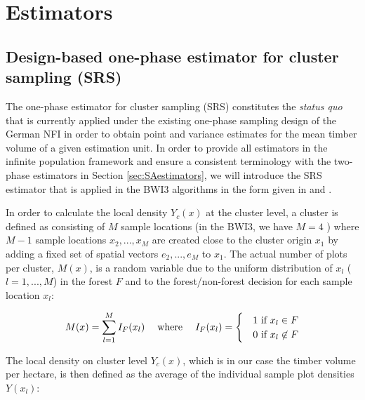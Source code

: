 \documentclass[remotesensing,article,submit,moreauthors,pdftex,10pt,a4paper]{mdpi}
\begin{document}
\section{Estimators}
\label{sec:estimators}


\subsection{Design-based one-phase estimator for cluster sampling (SRS)}
\label{sec:srs_estimator}

The one-phase estimator for cluster sampling (SRS) constitutes the \textit{status quo} that is currently applied under the existing one-phase sampling design of the German NFI in order to obtain point and variance estimates for the mean timber volume of a given estimation unit. In order to provide all estimators in the infinite population framework and ensure a consistent terminology with the two-phase estimators in Section \ref{sec:SAestimators}, we will introduce the SRS estimator that is applied in the BWI3 algorithms \citep{bwi3_ausw} in the form given in \citet{mandallaz2008} and \citet{mandallaz2016}.\par 
In order to calculate the local density $Y_{c}(x)$ at the cluster level, a cluster is defined as consisting of $M$ sample locations (in the BWI3, we have $M=4$ ) where $M-1$ sample locations $x_2, ..., x_M$ are created close to the cluster origin $x_1$ by adding a fixed set of spatial vectors $e_2, ..., e_M$ to $x_1$. The actual number of plots per cluster, $M(x)$, is a random variable due to the uniform distribution of $x_l$ ($l=1, ..., M$) in the forest $F$ and to the forest/non-forest decision for each sample location $x_l$:

\begin{equation}\label{eq:Mx}
M(x)=\sum_{l=1}^{M}I_{F}(x_l) \hspace{3ex} \text{where} \hspace{3ex} I_F(x_l)=\begin{cases}&1 \text{ if $x_l \in F$}\\
&0 \text{ if $x_l\not\in F$}
\end{cases}
\end{equation}

The local density on cluster level $Y_{c}(x)$, which is in our case the timber volume per hectare, is then defined as the average of the individual sample plot densities $Y(x_l)$:
\end{document}
